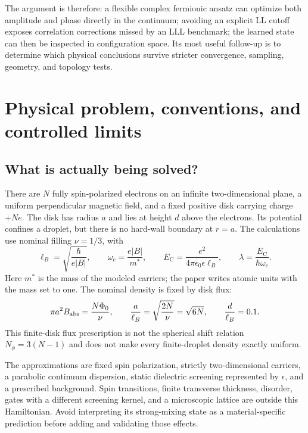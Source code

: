 \documentclass[11pt,letterpaper]{article}
\newcommand{\EC}{E_{\mathrm C}}
\begin{document}
The argument is therefore: a flexible complex fermionic ansatz can optimize both amplitude and phase directly in the continuum; avoiding an explicit LL cutoff exposes correlation corrections missed by an LLL benchmark; the learned state can then be inspected in configuration space. Its most useful follow-up is to determine which physical conclusions survive stricter convergence, sampling, geometry, and topology tests.

\section{Physical problem, conventions, and controlled limits}
\label{sec:physics}

\subsection{What is actually being solved?}

There are $N$ fully spin-polarized electrons on an infinite two-dimensional plane, a uniform perpendicular magnetic field, and a fixed positive disk carrying charge $+Ne$. The disk has radius $a$ and lies at height $d$ above the electrons. Its potential confines a droplet, but there is no hard-wall boundary at $r=a$. The calculations use nominal filling $\nu=1/3$, with
\begin{equation}
 \ell_B=\sqrt{\frac{\hbar}{e|B|}},\qquad
 \omega_c=\frac{e|B|}{m^*},\qquad
 \EC=\frac{e^2}{4\pi\epsilon_0\epsilon\ell_B},\qquad
 \lambda=\frac{\EC}{\hbar\omega_c}.
 \label{eq:scales}
\end{equation}
Here $m^*$ is the mass of the modeled carriers; the paper writes atomic units with the mass set to one. The nominal density is fixed by disk flux:
\begin{equation}
 \pi a^2 B_{\rm abs}=\frac{N\Phi_0}{\nu},\qquad
 \frac a{\ell_B}=\sqrt{\frac{2N}{\nu}}=\sqrt{6N},\qquad
 \frac d{\ell_B}=0.1.
 \label{eq:disk}
\end{equation}
This finite-disk flux prescription is not the spherical shift relation $N_\phi=3(N-1)$ and does not make every finite-droplet density exactly uniform.

The approximations are fixed spin polarization, strictly two-dimensional carriers, a parabolic continuum dispersion, static dielectric screening represented by $\epsilon$, and a prescribed background. Spin transitions, finite transverse thickness, disorder, gates with a different screening kernel, and a microscopic lattice are outside this Hamiltonian. Avoid interpreting its strong-mixing state as a material-specific prediction before adding and validating those effects.
\end{document}

